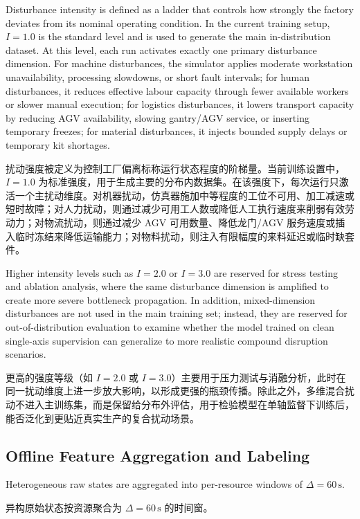 \documentclass[12pt,a4paper,oneside,scheme=plain]{ctexrep}
\newcommand{\bip}[2]{%
  \par #1\par
  \nobreak\vspace{0.12em}%
  {\small\color{black!62}#2}\par
  \vspace{0.62em}%
}
\begin{document}
\bip
{Disturbance intensity is defined as a ladder that controls how strongly the factory deviates from its nominal operating condition. In the current training setup, $I=1.0$ is the standard level and is used to generate the main in-distribution dataset. At this level, each run activates exactly one primary disturbance dimension. For machine disturbances, the simulator applies moderate workstation unavailability, processing slowdowns, or short fault intervals; for human disturbances, it reduces effective labour capacity through fewer available workers or slower manual execution; for logistics disturbances, it lowers transport capacity by reducing AGV availability, slowing gantry/AGV service, or inserting temporary freezes; for material disturbances, it injects bounded supply delays or temporary kit shortages.}
{扰动强度被定义为控制工厂偏离标称运行状态程度的阶梯量。当前训练设置中，$I=1.0$ 为标准强度，用于生成主要的分布内数据集。在该强度下，每次运行只激活一个主扰动维度。对机器扰动，仿真器施加中等程度的工位不可用、加工减速或短时故障；对人力扰动，则通过减少可用工人数或降低人工执行速度来削弱有效劳动力；对物流扰动，则通过减少 AGV 可用数量、降低龙门/AGV 服务速度或插入临时冻结来降低运输能力；对物料扰动，则注入有限幅度的来料延迟或临时缺套件。}

\bip
{Higher intensity levels such as $I=2.0$ or $I=3.0$ are reserved for stress testing and ablation analysis, where the same disturbance dimension is amplified to create more severe bottleneck propagation. In addition, mixed-dimension disturbances are not used in the main training set; instead, they are reserved for out-of-distribution evaluation to examine whether the model trained on clean single-axis supervision can generalize to more realistic compound disruption scenarios.}
{更高的强度等级（如 $I=2.0$ 或 $I=3.0$）主要用于压力测试与消融分析，此时在同一扰动维度上进一步放大影响，以形成更强的瓶颈传播。除此之外，多维混合扰动不进入主训练集，而是保留给分布外评估，用于检验模型在单轴监督下训练后，能否泛化到更贴近真实生产的复合扰动场景。}

\subsection[Offline Feature Aggregation and Labeling / 离线特征聚合与打标]{Offline Feature Aggregation and Labeling}
\label{sec:agg}

\bip
{Heterogeneous raw states are aggregated into per-resource windows of $\Delta=60\,\mathrm{s}$.}
{异构原始状态按资源聚合为 $\Delta=60\,\mathrm{s}$ 的时间窗。}
\end{document}
